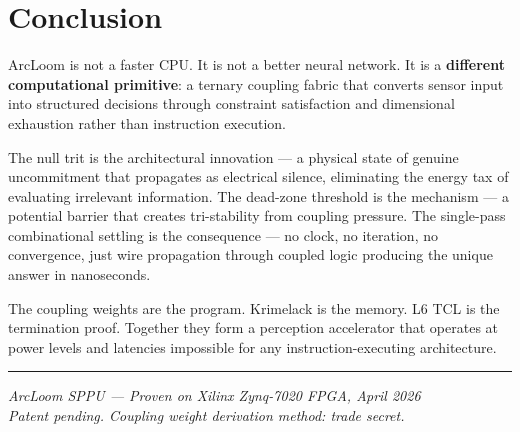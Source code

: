 \documentclass[11pt,a4paper]{article}
\begin{document}
\section{Conclusion}

ArcLoom is not a faster CPU. It is not a better neural network. It is a \textbf{different computational primitive}: a ternary coupling fabric that converts sensor input into structured decisions through constraint satisfaction and dimensional exhaustion rather than instruction execution.

The null trit is the architectural innovation --- a physical state of genuine uncommitment that propagates as electrical silence, eliminating the energy tax of evaluating irrelevant information. The dead-zone threshold is the mechanism --- a potential barrier that creates tri-stability from coupling pressure. The single-pass combinational settling is the consequence --- no clock, no iteration, no convergence, just wire propagation through coupled logic producing the unique answer in nanoseconds.

The coupling weights are the program. Krimelack is the memory. L6 TCL is the termination proof. Together they form a perception accelerator that operates at power levels and latencies impossible for any instruction-executing architecture.

\vspace{2em}
\noindent\rule{\textwidth}{0.4pt}
\begin{center}
\small\textit{ArcLoom SPPU --- Proven on Xilinx Zynq-7020 FPGA, April 2026}\\
\small\textit{Patent pending. Coupling weight derivation method: trade secret.}
\end{center}
\end{document}
